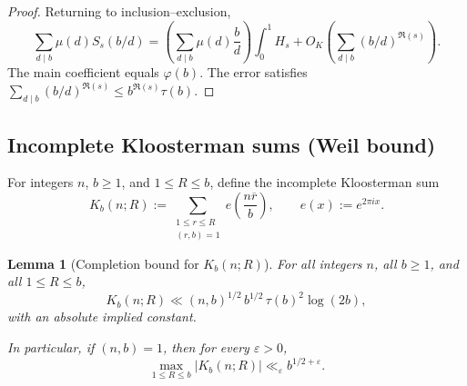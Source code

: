 \documentclass[a4paper,american,11pt]{amsart}
\theoremstyle{plain}
\newtheorem{lemma}[theorem]{Lemma}
\theoremstyle{definition}
\begin{document}
\begin{proof}
Returning to inclusion--exclusion,
\[
\sum_{d\mid b}\mu(d)S_s(b/d)
=
\left(\sum_{d\mid b}\mu(d)\frac{b}{d}\right)\int_0^1 H_s
+O_K\left(\sum_{d\mid b}(b/d)^{\Re(s)}\right).
\]
The main coefficient equals $\varphi(b)$. The error satisfies
\(\sum_{d\mid b}(b/d)^{\Re(s)}\le b^{\Re(s)}\tau(b)\).
\end{proof}

\subsection{Incomplete Kloosterman sums (Weil bound)}

For integers $n$, $b\ge1$, and $1\le R\le b$, define the incomplete Kloosterman sum
\[
K_b(n;R):=\sum_{\substack{1\le r\le R\\(r,b)=1}} e\!\left(\frac{n\overline r}{b}\right),
\qquad e(x):=e^{2\pi i x}.
\]
\begin{lemma}[Completion bound for \(K_b(n;R)\)]
\label{lem:inckloo}
For all integers \(n\), all \(b\ge 1\), and all \(1\le R\le b\),
\[
K_b(n;R)
\ll
(n,b)^{1/2}\,b^{1/2}\,\tau(b)^2\log(2b),
\]
with an absolute implied constant.

In particular, if \((n,b)=1\), then for every \(\varepsilon>0\),
\[
\max_{1\le R\le b}|K_b(n;R)|\ll_{\varepsilon} b^{1/2+\varepsilon}.
\]
\end{lemma}
\end{document}
